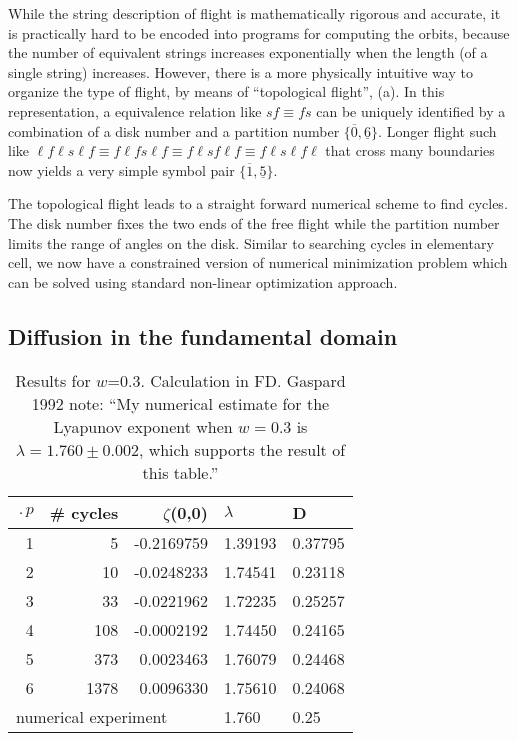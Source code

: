 \documentclass[aps,pre,
                showpacs,
                twocolumn,
                groupedaddress,
                floatfix]{revtex4-1}
\begin{document}
While the string description of flight is mathematically rigorous and accurate, it is practically hard to be encoded into programs for computing the orbits, because the number of equivalent strings increases exponentially when the length (of a single string) increases. However, there is a more physically intuitive way to organize the type of flight, by means of ``topological flight'',  (a). In this representation, a equivalence relation like $sf\equiv fs$ can be uniquely identified by a combination of a disk number and a partition number $\{\overline{0},\underline{6}\}$. Longer flight such like $\ell f \ell s \ell f \equiv  f \ell f s \ell f \equiv f \ell s f \ell f \equiv f \ell s \ell f \ell$ that cross many boundaries now yields a very simple symbol pair $\{\overline{1},\underline{5}\}$. 

The topological flight leads to a straight forward numerical scheme to find cycles. The disk number fixes the two ends of the free flight while the partition number limits the range of angles on the disk. Similar to searching cycles in elementary cell, we now have a constrained version of numerical minimization problem which can be solved using standard non-linear optimization approach. 


\subsection{Diffusion in the fundamental domain}
\begin{table}[htbp]
\hfill
{}
\begin{tabular}{|r|r|r|l|l|}
\hline
$\period{p}$ & \# cycles & $\zeta$(0,0) & $\lambda$ & D \\ \hline\hline
1      & 5      & -0.2169759 & 1.39193 & 0.37795 \\
2      & 10     & -0.0248233 & 1.74541 & 0.23118\\
3      & 33     & -0.0221962 & 1.72235 & 0.25257\\
4      & 108    & -0.0002192 & 1.74450 & 0.24165\\
5      & 373    &  0.0023463 & 1.76079 & 0.24468\\
6      & 1378   &  0.0096330 & 1.75610 & 0.24068\\ \hline\hline
\multicolumn{3}{|l|}{numerical experiment}
                           & 1.760 & 0.25
\\ \hline
\end{tabular}

\caption{\label{TCELL2}
  Results for $w$=0.3. Calculation in FD. Gaspard 1992
  note: ``My numerical estimate for the Lyapunov exponent when $w=0.3$ is
  $\lambda = 1.760 \pm 0.002$, which supports the result of this table.''
}
\end{table}
\end{document}
